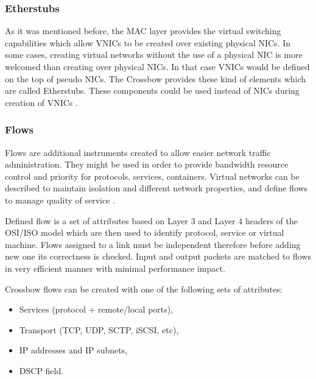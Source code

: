 \documentclass[11pt]{book}
\begin{document}
        \subsubsection{Etherstubs}

          As it was mentioned before, the MAC layer provides the virtual switching capabilities which allow VNICs to be
          created over existing physical NICs.  In some cases, creating virtual networks without the use of a physical
          NIC is more welcomed than creating over physical NICs. In that case VNICs would be defined on the top of
          pseudo NICs.  The Crossbow provides these kind of elements which are called Etherstubs. These components could
          be used instead of NICs during creation of VNICs \cite{crossbow}.


        \subsubsection{Flows}

          Flows are additional instruments created to allow easier network traffic administration. They might be used in
          order to provide bandwidth resource control and priority for protocols, services, containers. Virtual
          networks can be described to maintain isolation and different network properties, and define flows to manage quality
          of service \cite{network_virtualization}.

          Defined flow is a set of attributes based on Layer 3 and Layer 4 headers of the OSI/ISO model which are then
          used to identify protocol, service or virtual machine.  Flows assigned to a link must be independent therefore
          before adding new one its correctness is checked. Input and output packets are matched to flows in very
          efficient manner with minimal performance impact.

          \medskip

          Crossbow flows can be created with one of the following sets of attributes:

          \begin{itemize}
            \item Services (protocol + remote/local ports),
            \item Transport (TCP, UDP, SCTP, iSCSI, etc),
            \item IP addresses and IP subnets,
            \item DSCP field.
          \end{itemize}
\end{document}
